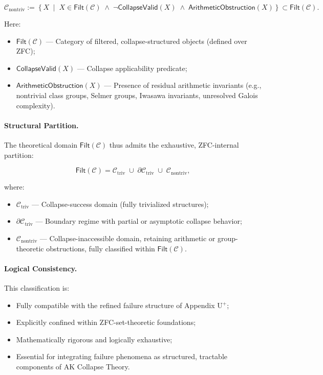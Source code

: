 \documentclass[11pt]{article}
\begin{document}
\[
\mathcal{C}_{\mathrm{nontriv}} := \left\{ X \;\middle|\; X \in \mathsf{Filt}(\mathcal{C}) \;\land\; \neg \mathsf{CollapseValid}(X) \;\land\; \mathsf{ArithmeticObstruction}(X) \right\} \subset \mathsf{Filt}(\mathcal{C}).
\]

Here:
\begin{itemize}
    \item $\mathsf{Filt}(\mathcal{C})$ — Category of filtered, collapse-structured objects (defined over ZFC);
    \item $\mathsf{CollapseValid}(X)$ — Collapse applicability predicate;
    \item $\mathsf{ArithmeticObstruction}(X)$ — Presence of residual arithmetic invariants (e.g., nontrivial class groups, Selmer groups, Iwasawa invariants, unresolved Galois complexity).
\end{itemize}

\paragraph{Structural Partition.}

The theoretical domain $\mathsf{Filt}(\mathcal{C})$ thus admits the exhaustive, ZFC-internal partition:

\[
\mathsf{Filt}(\mathcal{C}) = \mathcal{C}_{\mathrm{triv}} \;\cup\; \partial \mathcal{C}_{\mathrm{triv}} \;\cup\; \mathcal{C}_{\mathrm{nontriv}},
\]

where:

\begin{itemize}
    \item $\mathcal{C}_{\mathrm{triv}}$ — Collapse-success domain (fully trivialized structures);
    \item $\partial \mathcal{C}_{\mathrm{triv}}$ — Boundary regime with partial or asymptotic collapse behavior;
    \item $\mathcal{C}_{\mathrm{nontriv}}$ — Collapse-inaccessible domain, retaining arithmetic or group-theoretic obstructions, fully classified within $\mathsf{Filt}(\mathcal{C})$.
\end{itemize}

\paragraph{Logical Consistency.}

This classification is:

\begin{itemize}
    \item Fully compatible with the refined failure structure of Appendix U$^{+}$;
    \item Explicitly confined within ZFC-set-theoretic foundations;
    \item Mathematically rigorous and logically exhaustive;
    \item Essential for integrating failure phenomena as structured, tractable components of AK Collapse Theory.
\end{itemize}
\end{document}
